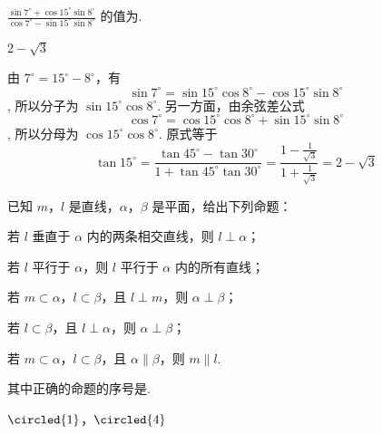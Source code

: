 \begin{problem}
\(\frac{\sin 7^{\circ} + \cos 15^{\circ}\sin 8^{\circ}}{\cos 7^{\circ} - \sin 15^{\circ}\sin 8^{\circ}}\) 的值为\fillinblank{}.
\end{problem}

\begin{answer}
\(2 - \sqrt{3}\)
\end{answer}

\begin{solution}
由 \(7^\circ=15^\circ-8^\circ\)，有
\[
\sin7^\circ=\sin15^\circ\cos8^\circ-\cos15^\circ\sin8^\circ
\],
所以分子为 \(\sin15^\circ\cos8^\circ\). 另一方面，由余弦差公式
\[
\cos7^\circ=\cos15^\circ\cos8^\circ+\sin15^\circ\sin8^\circ
\],
所以分母为 \(\cos15^\circ\cos8^\circ\). 原式等于
\[
\tan15^\circ
=\frac{\tan45^\circ-\tan30^\circ}{1+\tan45^\circ\tan30^\circ}
=\frac{1-\frac1{\sqrt3}}{1+\frac1{\sqrt3}}
=2-\sqrt3
\]
\end{solution}

\begin{problem}
已知 \(m\)，\(l\) 是直线，\(\alpha\)，\(\beta\) 是平面，给出下列命题：
\begin{circlelist}
\item 若 \(l\) 垂直于 \(\alpha\) 内的两条相交直线，则 \(l \perp \alpha\)；
\item 若 \(l\) 平行于 \(\alpha\)，则 \(l\) 平行于 \(\alpha\) 内的所有直线；
\item 若 \(m \subset \alpha\)，\(l \subset \beta\)，且 \(l \perp m\)，则 \(\alpha \perp \beta\)；
\item 若 \(l \subset \beta\)，且 \(l \perp \alpha\)，则 \(\alpha \perp \beta\)；
\item 若 \(m \subset \alpha\)，\(l \subset \beta\)，且 \(\alpha \parallel \beta\)，则 \(m \parallel l\).
\end{circlelist}
其中正确的命题的序号是\fillinblank{}.
\end{problem}

\begin{answer}
\(\circled{1}\)，\(\circled{4}\)
\end{answer}

